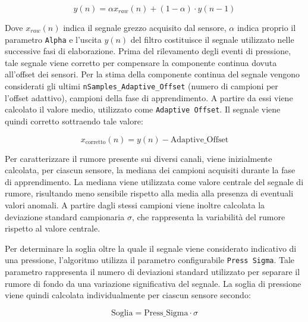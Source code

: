 \documentclass[10pt, a4paper]{article}
\begin{document}
                    \begin{equation}
                        y(n) = \alpha x_{raw}(n) + (1 - \alpha) \cdot y(n-1)
                    \end{equation}
                
                Dove $x_{raw}(n)$ indica il segnale grezzo acquisito dal sensore, $\alpha$ indica proprio il parametro \texttt{Alpha} e l'uscita $y(n)$ del filtro costituisce il segnale utilizzato nelle successive fasi di elaborazione. 
                Prima del rilevamento degli eventi di pressione, tale segnale viene corretto
                per compensare la componente continua dovuta all'offset dei sensori.
                Per la stima della componente continua del segnale vengono considerati gli ultimi
                \texttt{nSamples\_Adaptive\_Offset} (numero di campioni per l'offset adattivo), campioni della fase di apprendimento. A partire da essi viene calcolato il valore medio, utilizzato come \texttt{Adaptive Offset}. 
                Il segnale viene quindi corretto sottraendo tale valore: 

                    \begin{equation}
                        x_{\mathrm{corretto}}(n) =
                        y(n) -
                        \mathrm{Adaptive\_Offset}
                    \end{equation}

                Per caratterizzare il rumore presente sui diversi canali, viene inizialmente calcolata, per ciascun sensore, la mediana dei campioni acquisiti durante la fase di apprendimento. 
                La mediana viene utilizzata come valore centrale del segnale di rumore, risultando meno sensibile rispetto alla media alla presenza di eventuali valori anomali. 
                A partire dagli stessi campioni viene inoltre calcolata la deviazione standard campionaria $\sigma$, che rappresenta la variabilità del rumore rispetto al valore centrale.
                
                Per determinare la soglia oltre la quale il segnale viene considerato indicativo di una pressione, l'algoritmo utilizza il parametro configurabile \texttt{Press Sigma}. 
                Tale parametro rappresenta il numero di deviazioni standard utilizzato per separare il rumore di fondo da una variazione significativa del segnale. La soglia di pressione viene 
                quindi calcolata individualmente per ciascun sensore secondo:

                    \begin{equation}
                        \mathrm{Soglia} =
                        \mathrm{Press\_Sigma} \cdot \sigma
                    \end{equation}
\end{document}
